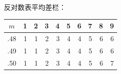 \begin{question}
\normalsize

反对数表平均差栏：

\scriptsize

\begin{center}
\begingroup\setlength{\tabcolsep}{4pt}
\begin{tabular}{crrrrrrrrr}
\toprule
$m$ & 1 & 2 & 3 & 4 & 5 & 6 & 7 & 8 & 9 \\
\midrule
.48 & 1 & 1 & 2 & 3 & 4 & 4 & 5 & 6 & 6 \\
.49 & 1 & 1 & 2 & 3 & 4 & 4 & 5 & 6 & 6 \\
.50 & 1 & 1 & 2 & 3 & 4 & 4 & 5 & 6 & 7 \\
\bottomrule
\end{tabular}
\endgroup
\end{center}

\normalsize

\end{question}

